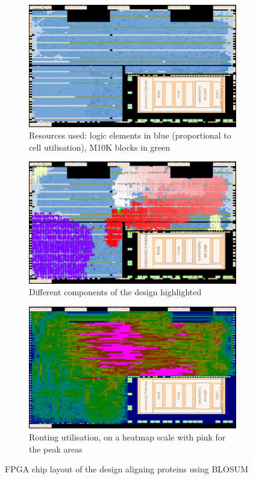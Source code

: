 \begin{figure}[H]
    \begin{subfigure}[b]{\linewidth}
    \centering
    \includegraphics[width=0.72\linewidth]{figs/eval/base_chip_plan_cropped.png}
    \caption{Resources used: logic elements in blue (proportional to cell utilisation), M10K blocks in green}
    \label{fig:Chip_plan_base}
    \vspace{2ex}
    \end{subfigure}
    \begin{subfigure}[b]{\linewidth}
    \centering
    \includegraphics[width=0.72\linewidth]{figs/eval/pe_array_cropped.png}
    \caption{Different components of the design highlighted}
    \label{fig:Chip_plan_array}
    \vspace{2ex}
    \end{subfigure}
\begin{subfigure}[b]{\linewidth}
    \centering
    \includegraphics[width=0.72\linewidth]{figs/eval/routing_cropped.png}
    \caption{Routing utilisation, on a heatmap scale with pink for the peak areas}
    \label{fig:Chip_plan_routing}
    \vspace{2ex}
    \end{subfigure}
    \caption{FPGA chip layout of the design aligning proteins using BLOSUM}
    \label{fig:Chip_plans}
\end{figure}

